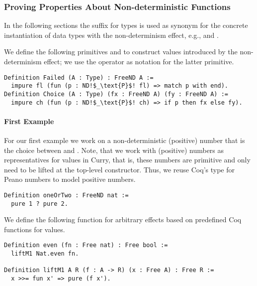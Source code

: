 \subsubsection{Proving Properties About Non\--deterministic Functions}

In the following sections the suffix  for types is used as synonym for the concrete instantiation of data types with the non\--determinism effect, e.g.,  and .

We define the following primitives  and  to construct values introduced by the non\--determinism effect; we use the operator  as notation for the latter primitive.

\begin{verbatim}
Definition Failed (A : Type) : FreeND A :=
  impure fl (fun (p : ND!$_\text{P}$! fl) => match p with end).
Definition Choice (A : Type) (fx : FreeND A) (fy : FreeND A) :=
  impure ch (fun (p : ND!$_\text{P}$! ch) => if p then fx else fy).
\end{verbatim}

\paragraph{First Example}
\label{par:firstNDExample}
For our first example we work on a non\--deterministic (positive) number that is the choice between  and .
Note, that we work with (positive) numbers as representatives for  values in Curry, that is, these numbers are primitive and only need to be lifted at the top\--level constructor.
Thus, we reuse Coq's type for Peano numbers  to model positive numbers.

\begin{verbatim}
Definition oneOrTwo : FreeND nat :=
  pure 1 ? pure 2.
\end{verbatim}

We define the following function  for arbitrary effects based on predefined Coq functions for  values.

\begin{verbatim}
Definition even (fn : Free nat) : Free bool :=
  liftM1 Nat.even fn.

Definition liftM1 A R (f : A -> R) (x : Free A) : Free R :=
  x >>= fun x' => pure (f x').
\end{verbatim}

